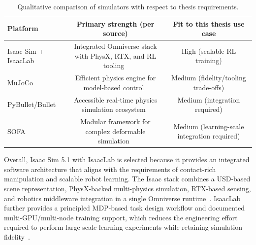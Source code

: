 \begin{table}[htb]
    \centering
    \caption{Qualitative comparison of simulators with respect to thesis requirements.}\label{tab:simulator_comparison}
    \begin{tabular}{l c c}
    \hline
    \textbf{Platform} & \textbf{Primary strength (per source)} & \textbf{Fit to this thesis use case} \\
    \hline
    Isaac Sim + IsaacLab & Integrated Omniverse stack with PhysX, RTX, and \ac{RL} tooling~\cite{nvidia_isaac_sim_510_what_is,Mittal2025IsaacLab} & High (scalable RL training) \\
    MuJoCo & Efficient physics engine for model-based control~\cite{Todorov2012MuJoCo} & Medium (fidelity/tooling trade-offs) \\
    PyBullet/Bullet & Accessible real-time physics simulation ecosystem~\cite{pybullet_homepage,Coumans2015Bullet} & Medium (integration required) \\
    SOFA & Modular framework for complex deformable simulation~\cite{Allard2007SOFA} & Medium (learning-scale integration required) \\
    \hline
    \end{tabular}
\end{table}

Overall, Isaac Sim 5.1 with IsaacLab is selected because it provides an integrated software architecture that aligns with the requirements of contact-rich manipulation and scalable robot learning. The Isaac stack combines a \ac{USD}-based scene representation, PhysX-backed multi-physics simulation, RTX-based sensing, and robotics middleware integration in a single Omniverse runtime~\cite{nvidia_isaac_sim_510_what_is,nvidia_isaac_sim_510_extensions_api}. IsaacLab further provides a principled \ac{MDP}-based task design workflow and documented multi-\ac{GPU}/multi-node training support, which reduces the engineering effort required to perform large-scale learning experiments while retaining simulation fidelity~\cite{isaaclab_manager_based_rl_env,isaaclab_multi_gpu_multinode,Mittal2025IsaacLab}.

